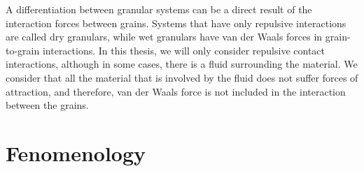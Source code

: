 
    A differentiation between granular systems can be a direct result of the interaction forces between grains. Systems that have only repulsive interactions are called dry granulars, while wet granulars have van der Waals forces in grain-to-grain interactions. In this thesis, we will only consider repulsive contact interactions, although in some cases, there is a fluid surrounding the material. We consider that all the material that is involved by the fluid does not suffer forces of attraction, and therefore, van der Waals force is not included in the interaction between the grains.

\section{Fenomenology}
\label{subchap:Fenomenologia}


